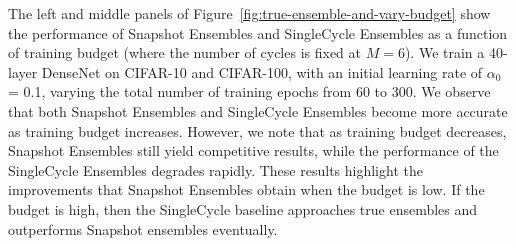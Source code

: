 The left and middle panels of Figure~\ref{fig:true-ensemble-and-vary-budget} show the performance of Snapshot Ensembles and SingleCycle Ensembles as a function of training budget (where the number of cycles is fixed at $M=6$). We train a 40-layer DenseNet on CIFAR-10 and CIFAR-100, with an initial learning rate of $\alpha_0$ = 0.1, varying the total number of training epochs from 60 to 300. We observe that both Snapshot Ensembles and SingleCycle Ensembles become more accurate as training budget increases. However, we note that as training budget decreases, Snapshot Ensembles still yield competitive results, while the performance of the SingleCycle Ensembles degrades rapidly. These results highlight the improvements that Snapshot Ensembles obtain when the budget is low. If the budget is high, then the SingleCycle baseline approaches true ensembles and outperforms Snapshot ensembles eventually. 


%
%

